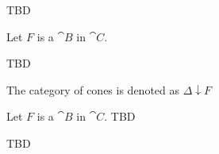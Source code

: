\begin{definition}[Colimit]
\label{def:colimit}
TBD
\end{definition}

\begin{definition}
\label{def:category_of_cones}
Let $F$ is a  $\cat{B}$ in $\cat{C}$.

TBD

The category of cones is denoted as $\Delta \downarrow F$ \cite{wiki:cone}
\end{definition}

\begin{remark}
\label{rem:category_of_cones}
Let $F$ is a  $\cat{B}$ in $\cat{C}$.
TBD
\end{remark}



TBD

